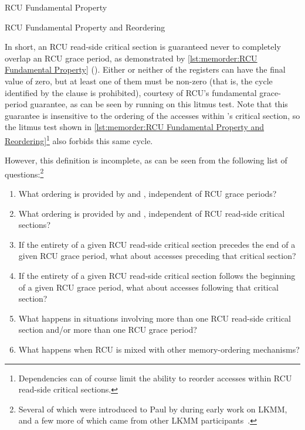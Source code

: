 \begin{listing}[tbp]

\caption{RCU Fundamental Property}
\label{lst:memorder:RCU Fundamental Property}
\end{listing}

\begin{listing}[tbp]

\caption{RCU Fundamental Property and Reordering}
\label{lst:memorder:RCU Fundamental Property and Reordering}
\end{listing}

In short, an RCU read-side critical section is guaranteed never to
completely overlap an RCU grace period, as demonstrated by
\cref{lst:memorder:RCU Fundamental Property}
().
Either or neither of the  registers can have the final value of zero,
but at least one of them must be non-zero (that is, the cycle identified
by the  clause is prohibited), courtesy of RCU's fundamental
grace-period guarantee, as can be seen by running  on this litmus test.
Note that this guarantee is insensitive to the ordering of the accesses
within 's critical section, so the litmus test shown in
\cref{lst:memorder:RCU Fundamental Property and Reordering}\footnote{
	Dependencies can of course limit the ability to reorder accesses
	within RCU read-side critical sections.}
also forbids this same cycle.

However, this definition is incomplete, as can be seen from the following
list of questions:\footnote{
	Several of which were introduced to Paul by  during
	early work on LKMM, and a few more of which came from other
	LKMM participants~\cite{Alglave:2018:FSC:3173162.3177156}.}

\begin{enumerate}
\item	What ordering is provided by 
	and , independent of RCU grace periods?
\item	What ordering is provided by 
	and , independent of RCU read-side
	critical sections?
\item	If the entirety of a given RCU read-side critical section
	precedes the end of a given RCU grace period, what about
	accesses preceding that critical section?
\item	If the entirety of a given RCU read-side critical section
	follows the beginning of a given RCU grace period, what about
	accesses following that critical section?
\item	What happens in situations involving more than one RCU read-side
	critical section and/or more than one RCU grace period?
\item	What happens when RCU is mixed with other memory-ordering
	mechanisms?
\end{enumerate}

